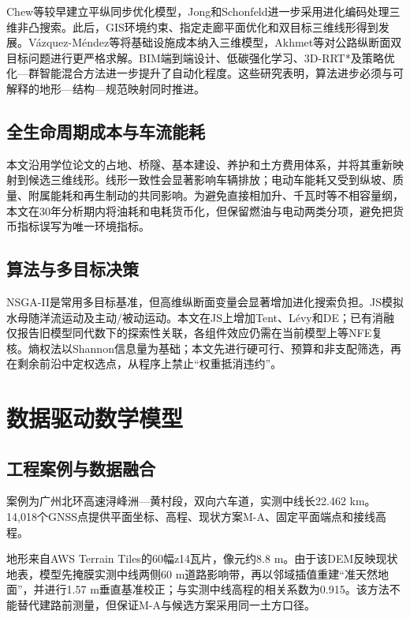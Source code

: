 \documentclass[preprint,12pt]{elsarticle}
\begin{document}
Chew等\cite{chew1989}较早建立平纵同步优化模型，Jong和Schonfeld\cite{jong2003}进一步采用进化编码处理三维非凸搜索。此后，GIS环境约束、指定走廊平面优化和双目标三维线形得到发展\cite{kang2012,mondal2015,hirpa2016}。V\'azquez-M\'endez等\cite{vazquez2018}将基础设施成本纳入三维模型，Akhmet等\cite{akhmet2022}对公路纵断面双目标问题进行更严格求解。BIM端到端设计、低碳强化学习、3D-RRT*及策略优化—群智能混合方法进一步提升了自动化程度\cite{han2023,he2023,pu2024,pu2026}。这些研究表明，算法进步必须与可解释的地形—结构—规范映射同时推进。

\subsection{全生命周期成本与车流能耗}

本文沿用学位论文\cite{lin2025}的占地、桥隧、基本建设、养护和土方费用体系，并将其重新映射到候选三维线形。线形一致性会显著影响车辆排放\cite{llopis2019}；电动车能耗又受到纵坡、质量、附属能耗和再生制动的共同影响\cite{dimartino2022}。为避免直接相加升、千瓦时等不相容量纲，本文在30年分析期内将油耗和电耗货币化，但保留燃油与电动两类分项，避免把货币指标误写为唯一环境指标。

\subsection{算法与多目标决策}

NSGA-II是常用多目标基准\cite{deb2002}，但高维纵断面变量会显著增加进化搜索负担。JS模拟水母随洋流运动及主动/被动运动\cite{chou2021}。本文在JS上增加Tent、L\'evy和DE\cite{storn1997}；已有消融仅报告旧模型同代数下的探索性关联，各组件效应仍需在当前模型上等NFE复核。熵权法以Shannon信息量为基础\cite{shannon1948}；本文先进行硬可行、预算和非支配筛选，再在剩余前沿中定权选点，从程序上禁止“权重抵消违约”。

\section{数据驱动数学模型}

\subsection{工程案例与数据融合}

案例为广州北环高速浔峰洲—黄村段，双向六车道，实测中线长22.462 km。14,018个GNSS点提供平面坐标、高程、现状方案M-A、固定平面端点和接线高程。

地形来自AWS Terrain Tiles\cite{awsterrain}的60幅z14瓦片，像元约8.8 m。由于该DEM反映现状地表，模型先掩膜实测中线两侧60 m道路影响带，再以邻域插值重建“准天然地面”，并进行1.57 m垂直基准校正；与实测中线高程的相关系数为0.915。该方法不能替代建路前测量，但保证M-A与候选方案采用同一土方口径。
\end{document}
